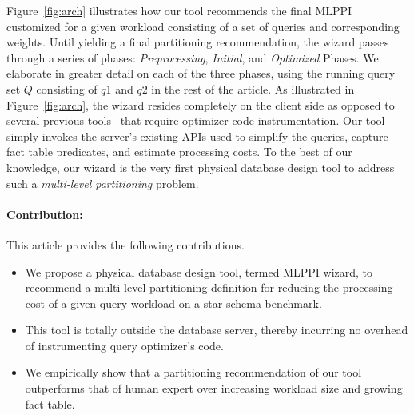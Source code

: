 \documentclass[runningheads]{comsis2}
\begin{document}
Figure~\ref{fig:arch} illustrates how our tool recommends 
the final MLPPI customized for a given workload consisting of 
a set of queries and corresponding weights. 
Until yielding a final partitioning recommendation, 
the wizard passes through a series of phases: {\em Preprocessing}, 
{\em Initial}, and {\em Optimized} Phases. 
We elaborate in greater detail on each of the three phases, 
using the running query set $Q$ consisting of $q$1 and $q2$ in the rest of the article. 
As illustrated in Figure~\ref{fig:arch}, the wizard resides completely on the client side as opposed to 
several previous tools~\cite{agrawal04:integrating,Lightstone04:db2auto,nehme2011automated} 
that require optimizer code instrumentation. 
Our tool simply invokes the server's existing APIs used to simplify the queries, capture fact table 
predicates, and estimate processing costs. 
To the best of our knowledge, our wizard  
is the very first physical database design tool 
to address such a {\em \hbox{multi-level} partitioning} problem. 

\paragraph{Contribution:} This article provides 
the following contributions. 

\begin{itemize}
\item We propose a physical database design tool, termed MLPPI wizard, to recommend a multi-level partitioning definition 
for reducing the processing cost of a given query workload on a star schema benchmark. 
\item This tool is totally outside the database server, thereby incurring no overhead of instrumenting query optimizer's code.
\item We empirically show that a partitioning recommendation of our tool outperforms that of human expert 
over increasing workload size and growing fact table.

\end{itemize}
\end{document}
